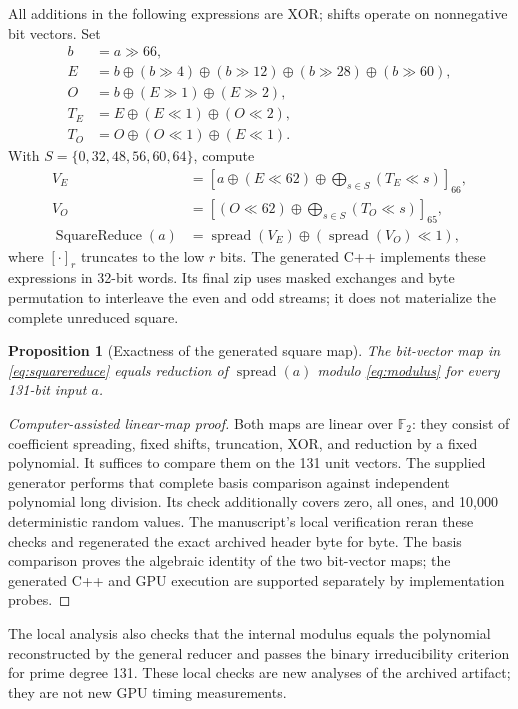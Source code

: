 \documentclass[11pt,a4paper]{article}
\newcommand{\F}{\mathbb{F}}
\newcommand{\spread}{\operatorname{spread}}
\newcommand{\xor}{\mathbin{\oplus}}
\newtheorem{proposition}{Proposition}
\begin{document}
All additions in the following expressions are XOR; shifts operate on nonnegative bit vectors. Set
\begin{align}
 b&=a\gg66,\\
 E&=b\xor(b\gg4)\xor(b\gg12)\xor(b\gg28)\xor(b\gg60),\\
 O&=b\xor(E\gg1)\xor(E\gg2),\\
 T_E&=E\xor(E\ll1)\xor(O\ll2),\\
 T_O&=O\xor(O\ll1)\xor(E\ll1).
\end{align}
With $S=\{0,32,48,56,60,64\}$, compute
\begin{align}
 V_E&=\left[a\xor(E\ll62)\xor\bigoplus_{s\in S}(T_E\ll s)\right]_{66},\\
 V_O&=\left[(O\ll62)\xor\bigoplus_{s\in S}(T_O\ll s)\right]_{65},\\
 \operatorname{SquareReduce}(a)&=\spread(V_E)\xor(\spread(V_O)\ll1),\label{eq:squarereduce}
\end{align}
where $[\cdot]_r$ truncates to the low $r$ bits. The generated C++ implements these expressions in 32-bit words. Its final zip uses masked exchanges and byte permutation to interleave the even and odd streams; it does not materialize the complete unreduced square.

\begin{proposition}[Exactness of the generated square map]
The bit-vector map in \cref{eq:squarereduce} equals reduction of $\spread(a)$ modulo \cref{eq:modulus} for every 131-bit input $a$.
\end{proposition}
\begin{proof}[Computer-assisted linear-map proof]
Both maps are linear over $\F_2$: they consist of coefficient spreading, fixed shifts, truncation, XOR, and reduction by a fixed polynomial. It suffices to compare them on the 131 unit vectors. The supplied generator performs that complete basis comparison against independent polynomial long division. Its check additionally covers zero, all ones, and 10,000 deterministic random values. The manuscript's local verification reran these checks and regenerated the exact archived header byte for byte. The basis comparison proves the algebraic identity of the two bit-vector maps; the generated C++ and GPU execution are supported separately by implementation probes.
\end{proof}

The local analysis also checks that the internal modulus equals the polynomial reconstructed by the general reducer and passes the binary irreducibility criterion for prime degree 131. These local checks are new analyses of the archived artifact; they are not new GPU timing measurements.
\end{document}
